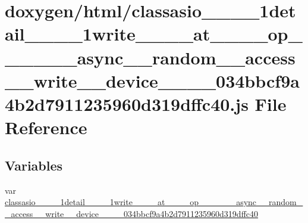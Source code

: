 \hypertarget{classasio____1____1detail____1____1write________at________op____3____01____async____random____ac93d102b542ec9f77fd2cfc30a1738f2f}{}\section{doxygen/html/classasio\+\_\+\+\_\+\_\+\+\_\+1detail\+\_\+\+\_\+\_\+\+\_\+1write\+\_\+\+\_\+\+\_\+\+\_\+at\+\_\+\+\_\+\+\_\+\+\_\+op\+\_\+\+\_\+\_\+\+\_\+\_\+\+\_\+async\+\_\+\+\_\+random\+\_\+\+\_\+access\+\_\+\+\_\+write\+\_\+\+\_\+device\+\_\+\+\_\+\_\+\+\_\+034bbcf9a4b2d7911235960d319dffc40.js File Reference}
\label{classasio____1____1detail____1____1write________at________op____3____01____async____random____ac93d102b542ec9f77fd2cfc30a1738f2f}
\subsection*{Variables}
\begin{DoxyCompactItemize}
\item 
var \hyperlink{classasio____1____1detail____1____1write________at________op____3____01____async____random____ac93d102b542ec9f77fd2cfc30a1738f2f_a94bc94c1075e7b24bcc6c97c00a73804}{classasio\+\_\+\+\_\+\_\+\+\_\+1detail\+\_\+\+\_\+\_\+\+\_\+1write\+\_\+\+\_\+\+\_\+\+\_\+at\+\_\+\+\_\+\+\_\+\+\_\+op\+\_\+\+\_\+\_\+\+\_\+\_\+\+\_\+async\+\_\+\+\_\+random\+\_\+\+\_\+access\+\_\+\+\_\+write\+\_\+\+\_\+device\+\_\+\+\_\+\_\+\+\_\+034bbcf9a4b2d7911235960d319dffc40}
\end{DoxyCompactItemize}


